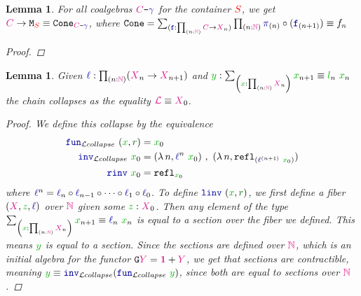 \documentclass[twoside,11pt,openright]{report}
\theoremstyle{plain} %
\newtheorem{lem}[thm]{Lemma}
\theoremstyle{definition}
\theoremstyle{remark}
\newcommand*{\term}[1]{\textcolor{green!70!black}{#1}} %
\newcommand*{\pathterm}[1]{\textcolor{green!40!black}{#1}}
\newcommand*{\type}[1]{\textcolor{magenta!90!black}{#1}}
\newcommand*{\container}[1]{\textcolor{red}{#1}}
\newcommand*{\unit}{\type{\textbf{1}}}
\newcommand*{\coalg}[2]{#1\texttt{-}#2}
\newcommand*{\function}[1]{\textcolor{blue!60!black}{\ensuremath{\mathtt{#1}}}}
\newcommand*{\typeformer}[1]{\ensuremath{\mathtt{#1}}}
\newcommand*{\functor}[1]{\ensuremath{\mathbf{\mathtt{#1}}}}
\begin{document}
\begin{lem} \label{lem:function-to-M-type-is-cone}
  For all coalgebras \(\coalg{\type{C}}{\function{\gamma}}\) for the container \(\container{S}\), we get \(\type{C} \rightarrow \typeformer{M}_{\container{S}} \equiv \typeformer{Cone}_{\coalg{\type{C}}{\function{\gamma}}}\), where \(\typeformer{Cone} = \sum_{(\function{f} : \prod_{(n : \type{\mathbb{N}})} \type{C} \rightarrow \type{X}_n)} \prod_{(n : \type{\mathbb{N}})} \function{\pi}_{(n)} \circ (\function{f}_{(n+1)}) \equiv f_n\)
  \begin{proof}
  \end{proof}
\end{lem}
\begin{lem} \label{lem:limit-collapse}
  Given \(\function{\ell} : \prod_{(n : \type{\mathbb{N}})} (\type{X}_{n} \rightarrow \type{X}_{n+1})\) and \(\term{y} : \sum_{\left(\term{x} : \prod_{(n : \type{\mathbb{N}})} \type{X}_n\right)} \term{x}_{n + 1} \equiv \term{l}_n~\term{x}_n\) the chain collapses as the equality \(\type{\mathcal{L}} \equiv \type{X}_0\).
  \begin{proof}
    We define this collapse by the equivalence
    \begin{align}
      \function{fun}_{\mathcal{L}collapse}~(\term{x} , \pathterm{r}) &= \term{x}_0 \\
      \function{inv}_{\mathcal{L}collapse}~\term{x}_0 &= (\lambda\,n, \function{\ell}^n~\term{x}_0)~,~(\lambda\,n, \mathtt{refl}_{(\function{\ell}^{(n+1)}~\term{x}_0)}) \\
      \function{rinv}~\term{x}_0 &= \mathtt{refl}_{\term{x}_0}
    \end{align}
    where \(\function{\ell}^n = \function{\ell}_n \circ \function{\ell}_{n-1} \circ \dots \circ \function{\ell}_1 \circ \function{\ell}_0\). To define \(\function{linv}~(\term{x} , \pathterm{r})\), we first define a fiber \((\type{X} , \term{z}, \function{\ell})\) over \(\type{\mathbb{N}}\) given some \(\term{z} : \type{X}_0\). Then any element of the type \(\sum_{\left(\term{x} : \prod_{(n : \type{\mathbb{N}})} \type{X}_n\right)} \term{x}_{n + 1} \equiv \function{\ell}_n~\term{x}_n\) is equal to a section over the fiber we defined. This means \(\term{y}\) is equal to a section. Since the sections are defined over \(\type{\mathbb{N}}\), which is an initial algebra for the functor \(\functor{G}\type{Y} = \unit + \type{Y}\), we get that sections are contractible, meaning \(\term{y} \equiv \function{inv}_{\mathcal{L}collapse} (\function{fun}_{\mathcal{L}collapse}~\term{y})\), since both are equal to sections over \(\type{\mathbb{N}}\).
\end{proof}
\end{lem}
\end{document}
